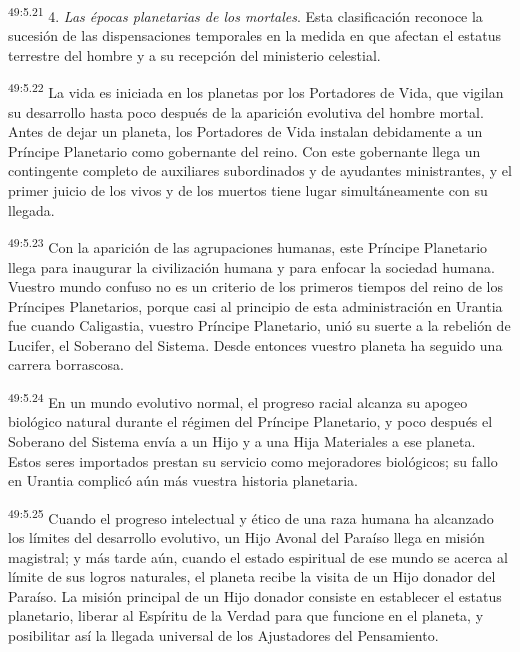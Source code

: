 \par
\textsuperscript{49:5.21} 4. \textit{Las épocas planetarias de los mortales}. Esta clasificación reconoce la sucesión de las dispensaciones temporales en la medida en que afectan el estatus terrestre del hombre y a su recepción del ministerio celestial.

\par
\textsuperscript{49:5.22} La vida es iniciada en los planetas por los Portadores de Vida, que vigilan su desarrollo hasta poco después de la aparición evolutiva del hombre mortal. Antes de dejar un planeta, los Portadores de Vida instalan debidamente a un Príncipe Planetario como gobernante del reino. Con este gobernante llega un contingente completo de auxiliares subordinados y de ayudantes ministrantes, y el primer juicio de los vivos y de los muertos tiene lugar simultáneamente con su llegada.

\par
\textsuperscript{49:5.23} Con la aparición de las agrupaciones humanas, este Príncipe Planetario llega para inaugurar la civilización humana y para enfocar la sociedad humana. Vuestro mundo confuso no es un criterio de los primeros tiempos del reino de los Príncipes Planetarios, porque casi al principio de esta administración en Urantia fue cuando Caligastia, vuestro Príncipe Planetario, unió su suerte a la rebelión de Lucifer, el Soberano del Sistema. Desde entonces vuestro planeta ha seguido una carrera borrascosa.

\par
\textsuperscript{49:5.24} En un mundo evolutivo normal, el progreso racial alcanza su apogeo biológico natural durante el régimen del Príncipe Planetario, y poco después el Soberano del Sistema envía a un Hijo y a una Hija Materiales a ese planeta. Estos seres importados prestan su servicio como mejoradores biológicos; su fallo en Urantia complicó aún más vuestra historia planetaria.

\par
\textsuperscript{49:5.25} Cuando el progreso intelectual y ético de una raza humana ha alcanzado los límites del desarrollo evolutivo, un Hijo Avonal del Paraíso llega en misión magistral; y más tarde aún, cuando el estado espiritual de ese mundo se acerca al límite de sus logros naturales, el planeta recibe la visita de un Hijo donador del Paraíso. La misión principal de un Hijo donador consiste en establecer el estatus planetario, liberar al Espíritu de la Verdad para que funcione en el planeta, y posibilitar así la llegada universal de los Ajustadores del Pensamiento.

